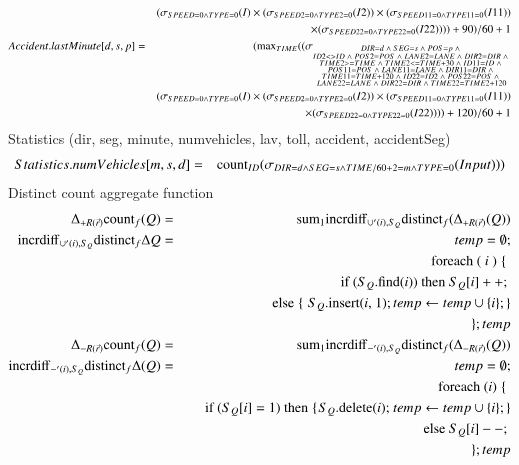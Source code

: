 \begin{eqnarray*}
&& (\sigma_{SPEED = 0 \wedge TYPE = 0} (I) \times (\sigma_{SPEED2 = 0 \wedge TYPE2 = 0} (I2)) \times (\sigma_{SPEED11 = 0 \wedge TYPE11 = 0} (I11)) \\
&&\times (\sigma_{SPEED22 = 0 \wedge TYPE22 = 0} (I22)) ) )+90)/60+1\\
%
Accident.lastMinute[d, s, p] &=& (\algmax_{TIME} (
(\sigma_{ \substack{DIR = d \;\wedge\; SEG = s \;\wedge\; POS = p \;\wedge\; \\ID2 <> ID \;\wedge\; POS2 = POS \;\wedge\; LANE2 = LANE \;\wedge\; DIR2 = DIR \;\wedge\; \\ TIME2 >= TIME \;\wedge\; TIME2 <= TIME + 30 \;\wedge\; ID11 = ID \;\wedge\;\\ POS11 = POS \;\wedge\;  LANE11 = LANE \;\wedge\; DIR11=DIR \;\wedge\; \\TIME11 = TIME + 120 \;\wedge\; ID22 = ID2 \;\wedge\; POS22 = POS \;\wedge\; \\ LANE22 = LANE \;\wedge\; DIR22 = DIR \;\wedge\; TIME22 = TIME2 + 120}} \\
&& (\sigma_{SPEED = 0 \wedge TYPE = 0} (I) \times (\sigma_{SPEED2 = 0 \wedge TYPE2 = 0} (I2)) \times (\sigma_{SPEED11 = 0 \wedge TYPE11 = 0} (I11)) \\
&&\times (\sigma_{SPEED22 = 0 \wedge TYPE22 = 0} (I22)) ) )+120)/60+1
\end{eqnarray*}
%
Statistics (dir, seg, minute, numvehicles, lav, toll, accident, accidentSeg)
\begin{eqnarray*}
Statistics.numVehicles[m, s, d] &=& \mbox{count}_{ID} (\sigma_{ DIR = d \wedge SEG = s \wedge TIME/60 + 2 = m \wedge TYPE = 0 }(Input) ))\\
\end{eqnarray*}
Distinct count aggregate function
\begin{eqnarray*}
\Delta_{+R(\vec{r})} \mbox{count}_{f} (Q) &=& \mathrm{sum}_{1} \mathrm{incrdiff}_{\cup'(i), S_{Q}} \mbox{distinct}_{f} (\Delta_{+R(\vec{r})} (Q))\\
\mathrm{incrdiff}_{\cup'(i), S_{Q}} \mbox{distinct}_{f} \Delta Q &=& temp = \emptyset ; \\
&& \mbox { foreach ( $i$ ) \{ } \\
&& \quad \mbox{ if ($S_Q$.find($i$)) then $S_Q[i] ++$; }\\
&& \quad \mbox{ else \{ $S_Q$.insert($i$, $1$)}; temp \leftarrow temp \cup \{i\};\} \\
&& \}; temp\\
\Delta_{-R(\vec{r})} \mbox{count}_{f} (Q) &=& \mathrm{sum}_{1} \mathrm{incrdiff}_{-'(i), S_{Q}} \mbox{distinct}_{f} (\Delta_{-R(\vec{r})} (Q))\\
\mathrm{incrdiff}_{-'(i), S_{Q}} \mbox{distinct}_{f} \Delta (Q) &=& temp = \emptyset ; \\
&& \mbox { foreach ($i$) \{ } \\
&& \quad \mbox{ if ($S_Q[i] = 1$) then \{$S_Q$.delete($i$); } temp \leftarrow temp \cup \{i\}; \} \\
&& \quad \mbox{ else $S_Q[i]--$; } \\
&& \}; temp \\
\end{eqnarray*}
